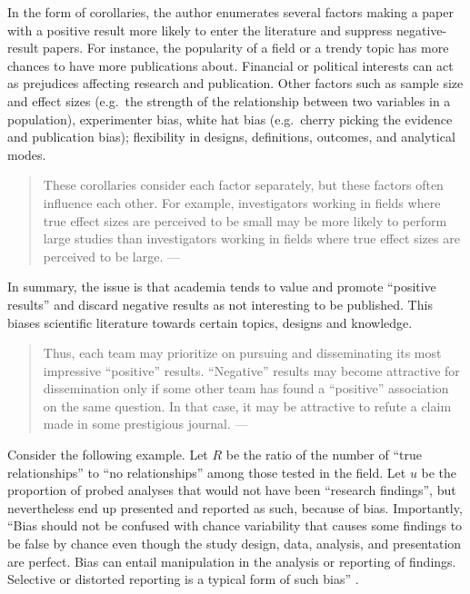 \documentclass[
  12pt,
]{book}
\begin{document}
In the form of corollaries, the author enumerates several factors making a paper with a positive result more likely to enter the literature and suppress negative-result papers. For instance, the popularity of a field or a trendy topic has more chances to have more publications about. Financial or political interests can act as prejudices affecting research and publication. Other factors such as sample size and effect sizes (e.g.~the strength of the relationship between two variables in a population), experimenter bias, white hat bias (e.g.~cherry picking the evidence and publication bias); flexibility in designs, definitions, outcomes, and analytical modes.

\begin{quote}
These corollaries consider each factor separately, but these factors often influence each other. For example, investigators working in fields where true effect sizes are perceived to be small may be more likely to perform large studies than investigators working in fields where true effect sizes are perceived to be large. --- \citep{ioannidis2005most}
\end{quote}

In summary, the issue is that academia tends to value and promote ``positive results'' and discard negative results as not interesting to be published. This biases scientific literature towards certain topics, designs and knowledge.

\begin{quote}
Thus, each team may prioritize on pursuing and disseminating its most impressive ``positive'' results. ``Negative'' results may become attractive for dissemination only if some other team has found a ``positive'' association on the same question. In that case, it may be attractive to refute a claim made in some prestigious journal. --- \citep{ioannidis2005most}
\end{quote}

Consider the following example. Let \(R\) be the ratio of the number of ``true relationships'' to ``no relationships'' among those tested in the field. Let \(u\) be the proportion of probed analyses that would not have been ``research findings'', but nevertheless end up presented and reported as such, because of bias. Importantly, ``Bias should not be confused with chance variability that causes some findings to be false by chance even though the study design, data, analysis, and presentation are perfect. Bias can entail manipulation in the analysis or reporting of findings. Selective or distorted reporting is a typical form of such bias'' \citep{ioannidis2005most}.
\end{document}
